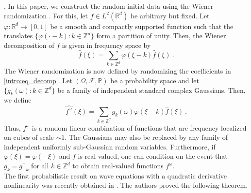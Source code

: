 \documentclass[11pt]{article}
\begin{document}
\cite{BOP15, BOP17, Bourgain94,Bourgain96,Bringmann18,BT08I,BT08II,DLM17,DLM18,KMV17,LM13,LM16,Pocovnicu17}. In this paper, we construct the random initial data using the Wiener randomization \cite{BOP15,LM13}. For this, let \( f \in L^2(\mathbb{R}^d) \) be arbitrary but fixed. Let \( \varphi\colon \mathbb{R}^d \rightarrow [0,1] \) be a smooth and compactly supported function such that the translates \( \{ \varphi(\cdot -k): k \in \mathbb{Z}^d \} \) form a partition of unity. Then, the Wiener decomposition of \( f \) is given in frequency space by
\begin{equation}\label{intro:eq_decomp}
\widehat{f}(\xi) = \sum_{k\in \mathbb{Z}^d} \varphi(\xi-k) \widehat{f}(\xi)~. 
\end{equation}
The Wiener randomization is now defined by randomizing the coefficients in \eqref{intro:eq_decomp}.  Let \( (\Omega, \mathscr{F}, \mathbb{P} ) \) be a probability space and let 
\( \{ g_k(\omega) \colon k \in \mathbb{Z}^d \} \) be a family of independent standard complex Gaussians. Then, we define
\begin{equation}\label{intro:eq_randomization}
\widehat{f^\omega}(\xi) = \sum_{k\in \mathbb{Z}^d} g_k(\omega) \varphi(\xi-k) \widehat{f}(\xi)~. 
\end{equation}
Thus, \( f^\omega \) is a random linear combination of functions that are frequency localized on cubes of scale \( \sim 1 \). The Gaussians may also be replaced by any family of independent uniformly sub-Gaussian random variables. Furthermore, if \( \varphi(\xi) = \varphi(-\xi) \) and \( f \) is real-valued, one can condition on the event that \( g_k = \overline{g_{-k}} \) for all \( k \in \mathbb{Z}^d \) to obtain real-valued functions \( f^\omega \).  \\

The first probabilistic result on wave equations with a quadratic derivative nonlinearity was recently obtained in \cite{CCMNS18}. The authors proved the following theorem. 
\end{document}
